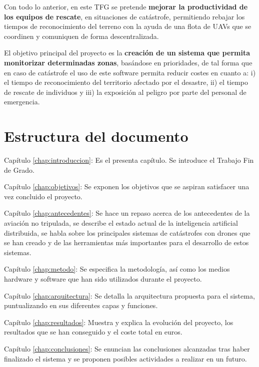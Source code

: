 Con todo lo anterior, en este TFG se pretende \textbf{mejorar la productividad de los equipos de rescate}, en situaciones de catástrofe, permitiendo rebajar los tiempos de reconocimiento del terreno con la ayuda de una flota de \acs{UAV}s que se coordinen y comuniquen de forma descentralizada.

El objetivo principal del proyecto es la \textbf{creación de un sistema que permita monitorizar determinadas zonas}, basándose en prioridades, de tal forma que en caso de catástrofe el uso de este software permita reducir costes en cuanto a: i) el tiempo de reconocimiento del territorio afectado por el desastre, ii) el tiempo de rescate de individuos y iii) la exposición al peligro por parte del personal de emergencia.

\section{Estructura del documento}

\begin{definitionlist}
\item[Capítulo \ref{chap:introduccion}: \nameref{chap:introduccion}] Es el presenta capítulo. Se introduce el Trabajo Fin de Grado.
\item[Capítulo \ref{chap:objetivos}: \nameref{chap:objetivos}] Se exponen los objetivos que se aspiran satisfacer una vez concluido el proyecto.
\item[Capítulo \ref{chap:antecedentes}: \nameref{chap:antecedentes}] Se hace un repaso acerca de los antecedentes de la aviación no tripulada, se describe el estado actual de la inteligencia artificial distribuida, se habla sobre los principales sistemas de catástrofes con drones que se han creado y de las herramientas más importantes para el desarrollo de estos sistemas.
\item[Capítulo \ref{chap:metodo}: \nameref{chap:metodo}] Se especifica la metodología, así como los medios hardware y software que han sido utilizados durante el proyecto.
\item[Capítulo \ref{chap:arquitectura}: \nameref{chap:arquitectura}] Se detalla la arquitectura propuesta para el sistema, puntualizando en sus diferentes capas y funciones.
\item[Capítulo \ref{chap:resultados}: \nameref{chap:resultados}] Muestra y explica la evolución del proyecto, los resultados que se han conseguido y el coste total en euros.
\item[Capítulo \ref{chap:conclusiones}: \nameref{chap:conclusiones}] Se enuncian las conclusiones alcanzadas tras haber finalizado el sistema y se proponen posibles actividades a realizar en un futuro.
\end{definitionlist}



